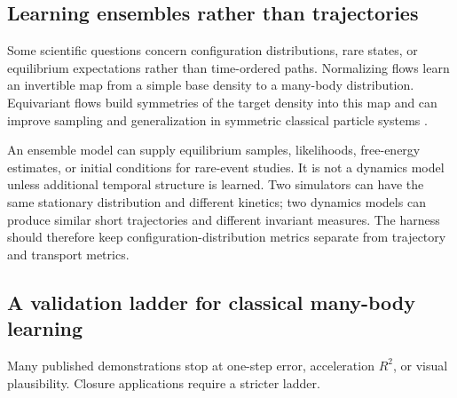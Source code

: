 \subsection{Learning ensembles rather than trajectories}

Some scientific questions concern configuration distributions, rare states, or equilibrium expectations rather than time-ordered paths. Normalizing flows learn an invertible map from a simple base density to a many-body distribution. Equivariant flows build symmetries of the target density into this map and can improve sampling and generalization in symmetric classical particle systems \citep{kohler2020equivariantflows}.

An ensemble model can supply equilibrium samples, likelihoods, free-energy estimates, or initial conditions for rare-event studies. It is not a dynamics model unless additional temporal structure is learned. Two simulators can have the same stationary distribution and different kinetics; two dynamics models can produce similar short trajectories and different invariant measures. The harness should therefore keep configuration-distribution metrics separate from trajectory and transport metrics.

\subsection{A validation ladder for classical many-body learning}

Many published demonstrations stop at one-step error, acceleration \(R^2\), or visual plausibility. Closure applications require a stricter ladder.

